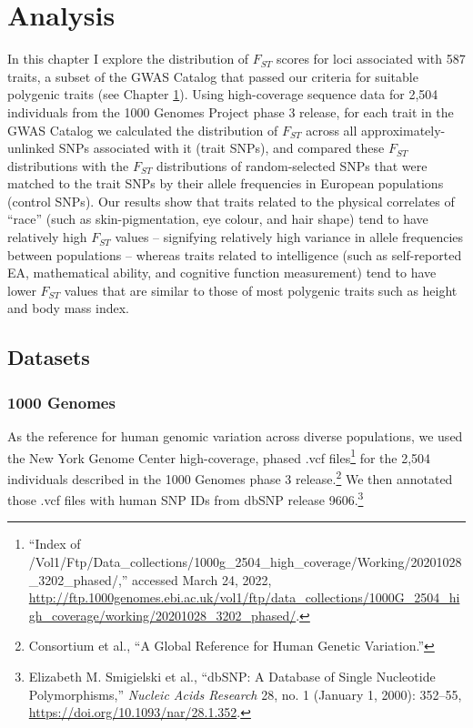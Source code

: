 \documentclass[
]{book}
\begin{document}
\hypertarget{Fst-analysis-chap}{%
\section{Analysis}\label{Fst-analysis-chap}}

In this chapter I explore the distribution of \(F_{ST}\) scores for loci associated with 587 traits, a subset of the GWAS Catalog that passed our criteria for suitable polygenic traits (see Chapter \ref{Fst-analysis-chap}). Using high-coverage sequence data for 2,504 individuals from the 1000 Genomes Project phase 3 release, for each trait in the GWAS Catalog we calculated the distribution of \(F_{ST}\) across all approximately-unlinked SNPs associated with it (trait SNPs), and compared these \(F_{ST}\) distributions with the \(F_{ST}\) distributions of random-selected SNPs that were matched to the trait SNPs by their allele frequencies in European populations (control SNPs). Our results show that traits related to the physical correlates of ``race'' (such as skin-pigmentation, eye colour, and hair shape) tend to have relatively high \(F_{ST}\) values -- signifying relatively high variance in allele frequencies between populations -- whereas traits related to intelligence (such as self-reported EA, mathematical ability, and cognitive function measurement) tend to have lower \(F_{ST}\) values that are similar to those of most polygenic traits such as height and body mass index.

\hypertarget{datasets}{%
\subsection{Datasets}\label{datasets}}

\hypertarget{genomes}{%
\subsubsection{1000 Genomes}\label{genomes}}

As the reference for human genomic variation across diverse populations, we used the New York Genome Center high-coverage, phased .vcf files\footnote{{``Index of /Vol1/Ftp/Data\_collections/{1000g}\_2504\_high\_coverage/Working/20201028\_3202\_phased/,''} accessed March 24, 2022, \url{http://ftp.1000genomes.ebi.ac.uk/vol1/ftp/data_collections/1000G_2504_high_coverage/working/20201028_3202_phased/}.} for the 2,504 individuals described in the 1000 Genomes phase 3 release.\footnote{Consortium et al., {``A Global Reference for Human Genetic Variation.''}} We then annotated those .vcf files with human SNP IDs from dbSNP release 9606.\footnote{Elizabeth M. Smigielski et al., {``{dbSNP}: A Database of Single Nucleotide Polymorphisms,''} \emph{Nucleic Acids Research} 28, no. 1 (January 1, 2000): 352--55, \url{https://doi.org/10.1093/nar/28.1.352}.}
\end{document}
